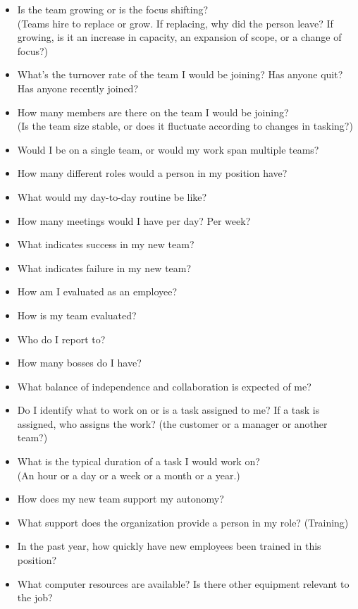 \begin{itemize}
    \item Is the team growing or is the focus shifting? \\
    (Teams hire to replace or grow. If replacing, why did the person leave? If growing, is it an increase in capacity, an expansion of scope, or a change of focus?)
    \item What's the turnover rate of the team I would be joining? Has anyone quit? Has anyone recently joined?
    \item How many members are there on the team I would be joining?\\
    (Is the team size stable, or does it fluctuate according to changes in tasking?)
    \item Would I be on a single team, or would my work span multiple teams?
    \item How many different roles would a person in my position have? 
    
    \item What would my day-to-day routine be like?
    \item How many meetings would I have per day? Per week?

    \item What indicates success in my new team? 
    \item What indicates failure in my new team? 
    \item How am I evaluated as an employee?
    \item How is my team evaluated?

    \item Who do I report to? 
    \item How many bosses do I have?

    \item What balance of independence and collaboration is expected of me?
    \item Do I identify what to work on or is a task assigned to me? If a task is assigned, who assigns the work? (the customer or a manager or another team?)
    \item What is the typical duration of a task I would work on? \\
    (An hour or a day or a week or a month or a year.)
    \item How does my new team support my autonomy?
    \item What support does the organization provide a person in my role? (Training)
    \item In the past year, how quickly have new employees been trained in this position?
    \item What computer resources are available? Is there other equipment relevant to the job? 


\end{itemize}
